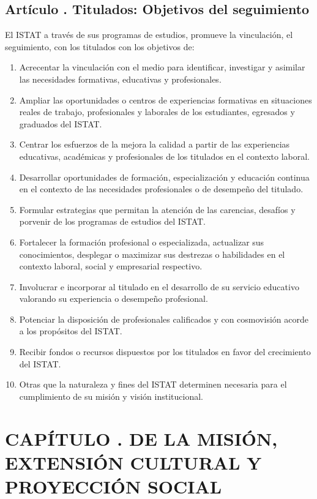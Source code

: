 \subsection{Artículo . Titulados: Objetivos del seguimiento}
\addtocounter{ns}{1}
El ISTAT a través de sus programas de estudios, promueve la vinculación, el seguimiento, con los titulados con los objetivos de: 
\begin{enumerate}
\item Acrecentar la vinculación con el medio para identificar, investigar y asimilar las necesidades formativas, educativas y profesionales. 
\item Ampliar las oportunidades o centros de experiencias formativas en situaciones reales de trabajo, profesionales y laborales de los estudiantes, egresados y graduados del ISTAT. 
\item Centrar los esfuerzos de la mejora la calidad a partir de las experiencias educativas, académicas y profesionales de los titulados en el contexto laboral. 
\item Desarrollar oportunidades de formación, especialización y educación continua en el contexto de las necesidades profesionales o de desempeño del titulado. 
\item Formular estrategias que permitan la atención de las carencias, desafíos y porvenir de los programas de estudios del ISTAT. 
\item Fortalecer la formación profesional o especializada, actualizar sus conocimientos, desplegar o maximizar sus destrezas o habilidades en el contexto laboral, social y empresarial respectivo. 
\item Involucrar e incorporar al titulado en el desarrollo de su servicio educativo valorando su experiencia o desempeño profesional. 
\item Potenciar la disposición de profesionales calificados y con cosmovisión acorde a los propósitos del ISTAT. 
\item Recibir fondos o recursos dispuestos por los titulados en favor del crecimiento del ISTAT. 
\item Otras que la naturaleza y fines del ISTAT determinen necesaria para el cumplimiento de su misión y visión institucional.
\end{enumerate}
\section{CAPÍTULO . DE LA MISIÓN, EXTENSIÓN CULTURAL Y PROYECCIÓN SOCIAL}
\addtocounter{re}{1}

